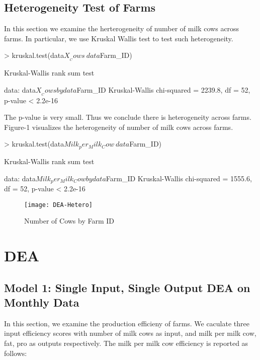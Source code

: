 \documentclass[12pt,]{article}
\begin{document}
\subsection{Heterogeneity Test of Farms}
In this section we examine the herterogeneity of number of milk cows across farms. In particular, we use Kruskal Wallis test to test such heterogeneity.

\begin{Schunk}
\begin{Sinput}
> kruskal.test(data$X__Cows ~ data$Farm_ID)               
\end{Sinput}
\begin{Soutput}
	Kruskal-Wallis rank sum test

data:  data$X__Cows by data$Farm_ID
Kruskal-Wallis chi-squared = 2239.8, df = 52, p-value < 2.2e-16
\end{Soutput}
\end{Schunk}
The p-value is very small. Thus we conclude there is heterogeneity across farms. Figure-1 visualizes the heterogeneity of number of milk cows across farms. 

\begin{Schunk}
\begin{Sinput}
> kruskal.test(data$Milk_per_Milk_Cow ~ data$Farm_ID)
\end{Sinput}
\begin{Soutput}
	Kruskal-Wallis rank sum test

data:  data$Milk_per_Milk_Cow by data$Farm_ID
Kruskal-Wallis chi-squared = 1555.6, df = 52, p-value < 2.2e-16
\end{Soutput}
\end{Schunk}

\begin{figure}[h]
\texttt{[image: DEA-Hetero]}
\caption{Number of Cows by Farm ID}
\end{figure}


\newpage
\section{DEA}
\subsection{Model 1: Single Input, Single Output DEA on Monthly Data}

In this section, we examine the production efficieny of farms. We caculate three input efficiency scores with number of milk cows as input, and milk per milk cow,  fat, pro as outputs respectively. The milk per milk cow efficiency is reported as follows:
\end{document}
